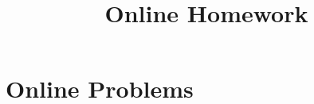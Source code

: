 \documentclass{ximera}
\title{Online Homework}
\begin{document}
\begin{abstract}
\end{abstract}
\maketitle
\section{Online Problems}









\end{document}
